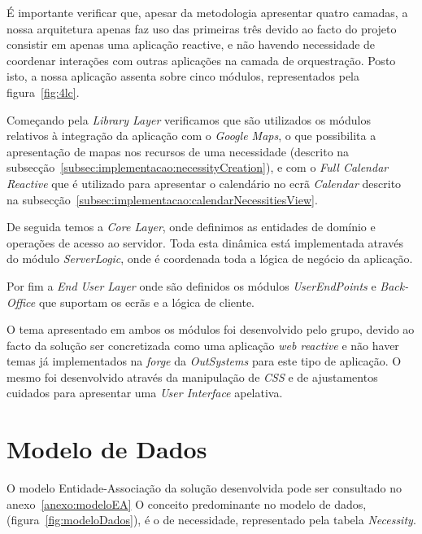 É importante verificar que, apesar da metodologia apresentar quatro camadas, 
a nossa arquitetura apenas faz uso das primeiras três devido ao facto do projeto consistir em apenas uma aplicação reactive, 
e não havendo necessidade de coordenar interações com outras aplicações na camada de orquestração. 
Posto isto, a nossa aplicação assenta sobre cinco módulos, representados pela figura~\ref{fig:4lc}.

Começando pela \textit{Library Layer} verificamos que são utilizados os módulos relativos à integração da aplicação 
com o \textit{Google Maps}, o que possibilita a apresentação de mapas nos recursos de uma necessidade (descrito na subsecção~\ref{subsec:implementacao:necessityCreation}), e com o \textit{Full Calendar Reactive} que é utilizado para apresentar o calendário no ecrã \textit{Calendar} descrito na subsecção~\ref{subsec:implementacao:calendarNecessitiesView}. 

\par
De seguida temos a \textit{ Core Layer}, 
onde definimos as entidades de domínio e operações de acesso ao servidor. Toda esta dinâmica está implementada através do módulo \textit{ServerLogic}, onde é coordenada toda a lógica de negócio da aplicação. 
\par
Por fim a \textit{ End User Layer} onde são definidos os módulos \textit{UserEndPoints} e \textit{Back-Office} que suportam os ecrãs e a lógica de cliente. 
\par
O tema apresentado em ambos os módulos foi desenvolvido pelo grupo, devido ao facto da solução ser concretizada como uma aplicação \textit{web reactive} e não haver temas já implementados na \textit{forge} da \textit{OutSystems} para este tipo de aplicação. 
O mesmo foi desenvolvido através da manipulação de \textit{CSS} e de ajustamentos cuidados para apresentar uma \textit{User Interface} apelativa.

\newpage

\section{Modelo de Dados}\label{sec:ModeloDados}

O modelo Entidade-Associação da solução desenvolvida pode ser consultado no anexo~\ref{anexo:modeloEA}
O conceito predominante no modelo de dados, (figura~\ref{fig:modeloDados}), é o de necessidade, representado pela tabela \textit{Necessity}.

